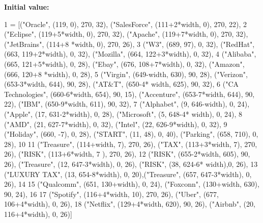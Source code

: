 {\bfseries Initial value\+:}
\begin{DoxyCode}
1 =  [(\textcolor{stringliteral}{"Oracle"}, (119, 0), 270, 32), (\textcolor{stringliteral}{"SalesForce"}, (111+2*width, 0), 270, 22),
2         (\textcolor{stringliteral}{"Eclipse"}, (119+5*width, 0), 270, 32), (\textcolor{stringliteral}{"Apache"}, (119+7*width, 0), 270, 32), (\textcolor{stringliteral}{"JetBrains"}, (114+8
      *width, 0), 270, 26),
3         (\textcolor{stringliteral}{"W3"}, (689, 97), 0, 32), (\textcolor{stringliteral}{"RedHat"}, (663, 119+2*width), 0, 32), (\textcolor{stringliteral}{"Mozilla"}, (664, 122+3*width), 0,
       32),
4         (\textcolor{stringliteral}{"Alibaba"}, (665, 121+5*width), 0, 28), (\textcolor{stringliteral}{"Ebay"}, (676, 108+7*width), 0, 32), (\textcolor{stringliteral}{"Amazon"}, (666, 120+8
      *width), 0, 28),
5         (\textcolor{stringliteral}{"Virgin"}, (649-width, 630), 90, 28), (\textcolor{stringliteral}{"Verizon"}, (653-3*width, 644), 90, 28), (\textcolor{stringliteral}{"AT&T"}, (650-4*
      width, 625), 90, 32),
6         (\textcolor{stringliteral}{"CA Technologies"}, (660-6*width, 654), 90, 15), (\textcolor{stringliteral}{"Accenture"}, (653-7*width, 644), 90, 22), (\textcolor{stringliteral}{"IBM"},
       (650-9*width, 611), 90, 32),
7         (\textcolor{stringliteral}{"Alphabet"}, (9, 646-width), 0, 24), (\textcolor{stringliteral}{"Apple"}, (17, 631-2*width), 0, 28), (\textcolor{stringliteral}{"Microsoft"}, (5, 648-4*
      width), 0, 24),
8         (\textcolor{stringliteral}{"AMD"}, (21, 627-7*width), 0, 32), (\textcolor{stringliteral}{"Intel"}, (22, 626-9*width), 0, 32),
9         (\textcolor{stringliteral}{"Holiday"}, (660, -7), 0, 28), (\textcolor{stringliteral}{"START"}, (11, 48), 0, 40), (\textcolor{stringliteral}{"Parking"}, (658, 710), 0, 28),
10 
11         (\textcolor{stringliteral}{"Treasure"}, (114+width, 7), 270, 26), (\textcolor{stringliteral}{"TAX"}, (113+3*width, 7), 270, 26), (\textcolor{stringliteral}{"RISK"}, (113+6*width, 7
      ), 270, 26),
12         (\textcolor{stringliteral}{"RISK"}, (655-2*width, 605), 90, 26), (\textcolor{stringliteral}{"Treasure"}, (12, 647-3*width), 0, 26), (\textcolor{stringliteral}{"RISK"}, (38, 624-6*
      width),0, 26),
13         (\textcolor{stringliteral}{"LUXURY TAX"}, (13, 654-8*width), 0, 20),(\textcolor{stringliteral}{"Treasure"}, (657, 647-3*width), 0, 26),
14 
15         (\textcolor{stringliteral}{"Qualcomm"}, (651, 130+width), 0, 24), (\textcolor{stringliteral}{"Foxconn"}, (130+width, 630), 90, 24),
16 
17         (\textcolor{stringliteral}{"Spotify"}, (116+4*width, 10), 270, 26), (\textcolor{stringliteral}{"Uber"}, (677, 106+4*width), 0, 26),
18         (\textcolor{stringliteral}{"Netflix"}, (129+4*width, 620), 90, 26), (\textcolor{stringliteral}{"Airbnb"}, (20, 116+4*width), 0, 26)]
\end{DoxyCode}
\mbox{\label{namespaceplan_drawing_ae766d314d267c74a5be2ebb84fffce5c}} 
